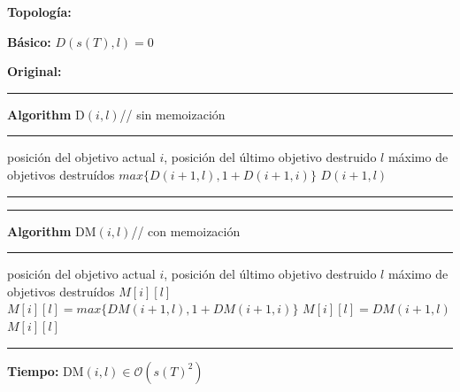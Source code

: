 \documentclass[a4paper, 12pt]{article}
\def\bigO{\mathcal{O}}
\begin{document}
\textbf{Topología: }\\[-5mm]
\strut\hfill

\hfill\strut\par

\textbf{Básico:} $D(s(T),l) = 0$

\textbf{Original:}\\[-2mm]
\begin{minipage}[t]{78mm}
  \hrule{\bf Algorithm} D$(i,l)$\hfill// sin memoización\hrule
  \begin{algorithmic}[1]
    \mInput posición del objetivo actual $i$, posición del último objetivo destruido $l$
    \mOutput máximo de objetivos destruídos
    \EndIf
    \Return $max\{D(i+1,l), 1+D(i+1,i)\}$
    \Else
    \Return $D(i+1,l)$
    \EndIf
  \end{algorithmic}\hrule
\end{minipage}\hfill\begin{minipage}[t]{88mm}
  \hrule{\bf Algorithm} DM$(i,l)$\hfill// con memoización\hrule
  \begin{algorithmic}[1]
    \mInput posición del objetivo actual $i$, posición del último objetivo destruido $l$
    \mOutput máximo de objetivos destruídos
    \EndIf
    \Return $M[i][l]$
    \EndIf
    \State $M[i][l]=max\{DM(i+1,l), 1+DM(i+1,i)\}$
    \Else
    \State $M[i][l]=DM(i+1,l)$
    \EndIf
    \Return $M[i][l]$
  \end{algorithmic}\hrule
\end{minipage}

\textbf{Tiempo:} DM$(i,l)\in \bigO(s(T)^2)$
\end{document}
